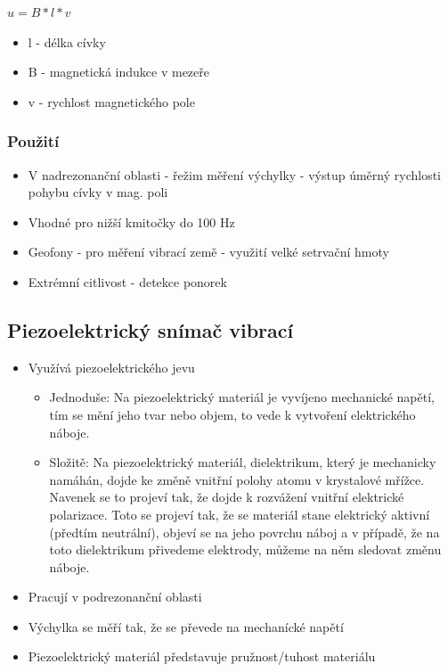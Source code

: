 $u = B*l*v$
\begin{itemize}
    \item l - délka cívky
    \item B - magnetická indukce v mezeře
    \item v - rychlost magnetického pole
\end{itemize}

\subsubsection*{Použití}
\begin{itemize}
    \item V nadrezonanční oblasti - řežim měření výchylky - výstup úměrný rychlosti pohybu cívky v mag. poli
    \item Vhodné pro nižší kmitočky do 100 Hz
    \item Geofony - pro měření vibrací země - využití velké setrvační hmoty
    \item Extrémní citlivost - detekce ponorek
\end{itemize}

\subsection*{Piezoelektrický snímač vibrací}
\begin{itemize}
    \item Využívá piezoelektrického jevu \begin{itemize}
              \item Jednoduše: Na piezoelektrický materiál je vyvíjeno mechanické napětí, tím se mění jeho tvar nebo objem, to vede k vytvoření elektrického náboje.
              \item Složitě: Na piezoelektrický materiál, dielektrikum, který je mechanicky namáhán, dojde ke změně vnitřní polohy atomu v krystalové mřížce. Navenek se to projeví tak, že dojde k rozvážení vnitřní elektrické polarizace. Toto se projeví tak, že se materiál stane elektrický aktivní (předtím neutrální), objeví se na jeho povrchu náboj a v případě, že na toto dielektrikum přivedeme elektrody, můžeme na něm sledovat změnu náboje.
          \end{itemize}
    \item Pracují v podrezonanční oblasti
    \item Výchylka se měří tak, že se převede na mechanícké napětí
    \item Piezoelektrický materiál představuje pružnost/tuhost materiálu
\end{itemize}

